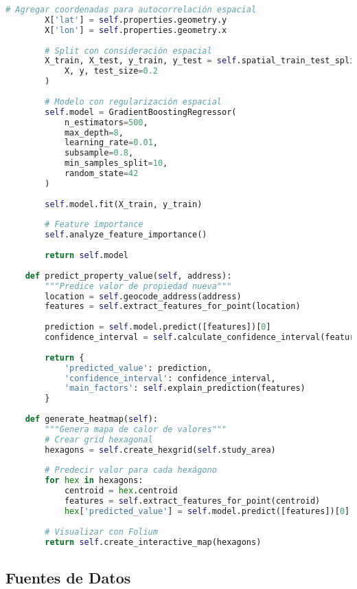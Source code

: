 \documentclass[12pt,a4paper]{article}
\begin{document}
\begin{lstlisting}[language=Python, caption=Pipeline principal del sistema]
        # Agregar coordenadas para autocorrelación espacial
        X['lat'] = self.properties.geometry.y
        X['lon'] = self.properties.geometry.x
        
        # Split con consideración espacial
        X_train, X_test, y_train, y_test = self.spatial_train_test_split(
            X, y, test_size=0.2
        )
        
        # Modelo con regularización espacial
        self.model = GradientBoostingRegressor(
            n_estimators=500,
            max_depth=8,
            learning_rate=0.01,
            subsample=0.8,
            min_samples_split=10,
            random_state=42
        )
        
        self.model.fit(X_train, y_train)
        
        # Feature importance
        self.analyze_feature_importance()
        
        return self.model
    
    def predict_property_value(self, address):
        """Predice valor de propiedad nueva"""
        location = self.geocode_address(address)
        features = self.extract_features_for_point(location)
        
        prediction = self.model.predict([features])[0]
        confidence_interval = self.calculate_confidence_interval(features)
        
        return {
            'predicted_value': prediction,
            'confidence_interval': confidence_interval,
            'main_factors': self.explain_prediction(features)
        }
    
    def generate_heatmap(self):
        """Genera mapa de calor de valores"""
        # Crear grid hexagonal
        hexagons = self.create_hexgrid(self.study_area)
        
        # Predecir valor para cada hexágono
        for hex in hexagons:
            centroid = hex.centroid
            features = self.extract_features_for_point(centroid)
            hex['predicted_value'] = self.model.predict([features])[0]
        
        # Visualizar con Folium
        return self.create_interactive_map(hexagons)
\end{lstlisting}

\subsection{Fuentes de Datos}
\end{document}
